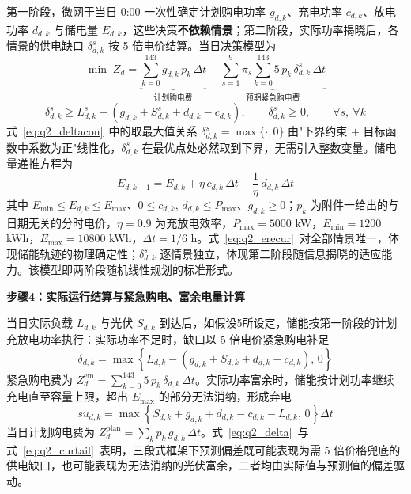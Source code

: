 第一阶段，微网于当日 0:00 一次性确定计划购电功率 $g_{d,k}$、充电功率 $c_{d,k}$、放电功率 $d_{d,k}$ 与储电量 $E_{d,k}$，这些决策\textbf{不依赖情景}；第二阶段，实际功率揭晓后，各情景的供电缺口 $\delta^{s}_{d,k}$ 按 5 倍电价结算。当日决策模型为
\begin{equation}
    \min\; Z_d=\underbrace{\sum_{k=0}^{143} g_{d,k}\,p_k\,\Delta t}_{\text{计划购电费}}
    +\underbrace{\sum_{s=1}^{9}\pi_s\sum_{k=0}^{143}5\,p_k\,\delta^{s}_{d,k}\,\Delta t}_{\text{预期紧急购电费}}
\end{equation}
\begin{equation}
    \delta^{s}_{d,k}\geq L^{s}_{d,k}-\left(g_{d,k}+S^{s}_{d,k}+d_{d,k}-c_{d,k}\right),\qquad
    \delta^{s}_{d,k}\geq 0,\qquad \forall s,\ \forall k
    \label{eq:q2_deltacon}
\end{equation}
式~\eqref{eq:q2_deltacon}~中的取最大值关系 $\delta^{s}_{d,k}=\max\{\cdot,0\}$ 由"下界约束 $+$ 目标函数中系数为正"线性化，$\delta^{s}_{d,k}$ 在最优点处必然取到下界，无需引入整数变量。储电量递推方程为
\begin{equation}
    E_{d,k+1}=E_{d,k}+\eta\,c_{d,k}\,\Delta t-\frac{1}{\eta}\,d_{d,k}\,\Delta t
    \label{eq:q2_erecur}
\end{equation}
其中 $E_{\min}\leq E_{d,k}\leq E_{\max}$、$0\leq c_{d,k},\,d_{d,k}\leq P_{\max}$、$g_{d,k}\geq 0$；$p_k$ 为附件一给出的与日期无关的分时电价，$\eta=0.9$ 为充放电效率，$P_{\max}=5000$ kW，$E_{\min}=1200$ kWh，$E_{\max}=10800$ kWh，$\Delta t=1/6$ h。式~\eqref{eq:q2_erecur}~对全部情景唯一，体现储能轨迹的物理确定性；$\delta^{s}_{d,k}$ 逐情景独立，体现第二阶段随信息揭晓的适应能力。该模型即两阶段随机线性规划的标准形式\cite{birge2011}。

\textbf{步骤4：实际运行结算与紧急购电、富余电量计算}

当日实际负载 $L_{d,k}$ 与光伏 $S_{d,k}$ 到达后，如假设5所设定，储能按第一阶段的计划充放电功率执行：实际功率不足时，缺口以 5 倍电价紧急购电补足
\begin{equation}
    \delta_{d,k}=\max\left\{L_{d,k}-\left(g_{d,k}+S_{d,k}+d_{d,k}-c_{d,k}\right),\,0\right\}
    \label{eq:q2_delta}
\end{equation}
紧急购电费为 $Z^{\mathrm{em}}_{d}=\sum_{k=0}^{143}5\,p_k\,\delta_{d,k}\,\Delta t$。实际功率富余时，储能按计划功率继续充电直至容量上限，超出 $E_{\max}$ 的部分无法消纳，形成弃电
\begin{equation}
    su_{d,k}=\max\left\{S_{d,k}+g_{d,k}+d_{d,k}-c_{d,k}-L_{d,k},\,0\right\}\Delta t
    \label{eq:q2_curtail}
\end{equation}
当日计划购电费为 $Z^{\mathrm{plan}}_{d}=\sum_k p_k\,g_{d,k}\,\Delta t$。式~\eqref{eq:q2_delta}~与式~\eqref{eq:q2_curtail}~表明，三段式框架下预测偏差既可能表现为需 5 倍价格兜底的供电缺口，也可能表现为无法消纳的光伏富余，二者均由实际值与预测值的偏差驱动。

